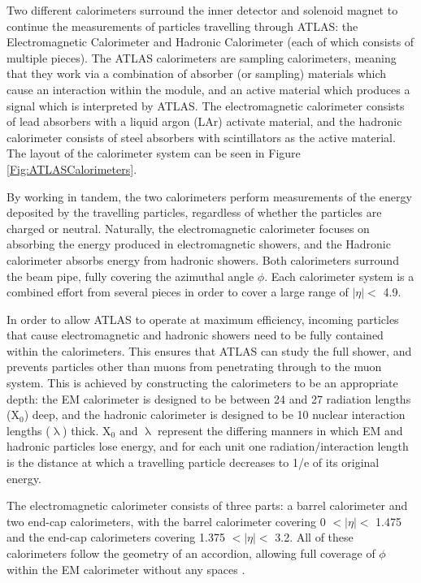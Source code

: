 \documentclass[12pt,a4paper,epsf,portrait,times,epsfig]{article}
\begin{document}
		Two different calorimeters surround the inner detector and solenoid magnet to continue the measurements of particles travelling through ATLAS: the Electromagnetic Calorimeter and Hadronic Calorimeter (each of which consists of multiple pieces). The ATLAS calorimeters are sampling calorimeters, meaning that they work via a combination of absorber (or sampling) materials which cause an interaction within the module, and an
		active material which produces a signal which is interpreted by ATLAS. The electromagnetic	calorimeter consists of lead absorbers with a liquid argon (LAr) activate material, and the hadronic calorimeter consists of steel absorbers with scintillators as the active material. The layout of the calorimeter system can be seen in Figure \ref{Fig:ATLASCalorimeters}. \par
		
		By working in tandem, the two calorimeters perform measurements of the energy deposited by the travelling particles, regardless of whether the particles are charged or neutral. Naturally, the electromagnetic calorimeter focuses on absorbing the energy produced in electromagnetic showers, and the Hadronic calorimeter absorbs energy from hadronic
		showers. Both calorimeters surround the beam pipe, fully covering the azimuthal angle	$\phi$. Each calorimeter system is a combined effort from several pieces in order to cover a large range of $|\eta| <$ 4.9. \par
		
		In order to allow ATLAS to operate at maximum efficiency, incoming particles that cause electromagnetic and hadronic showers need to be fully contained within the calorimeters. This ensures that ATLAS can study the full shower, and prevents particles other than muons from penetrating through to the muon system. This is achieved by constructing the	calorimeters to be an appropriate depth: the EM calorimeter is designed to be between	24 and 27 radiation lengths (X$_{0}$) deep, and the hadronic calorimeter is designed to be 10 nuclear interaction lengths ($\uplambda$) thick. X$_{0}$ and $\uplambda$ represent the differing manners in which EM and hadronic particles lose energy, and for each unit one radiation/interaction length
		is the distance at which a travelling particle decreases to 1/e of its original energy.\par
		
		The electromagnetic calorimeter consists of three parts: a barrel calorimeter and two end-cap calorimeters, with the barrel calorimeter covering 0 $< |\eta| <$ 1.475 and the end-cap calorimeters covering 1.375 $< |\eta| <$ 3.2. All of these calorimeters follow the geometry of
		an accordion, allowing full coverage of $\phi$ within the EM calorimeter without any spaces 
		\cite{ATLAS-TDR-01, ATLAS-TDR-02, Article:ATLASDesignPaper}. \par 
		
\end{document}
